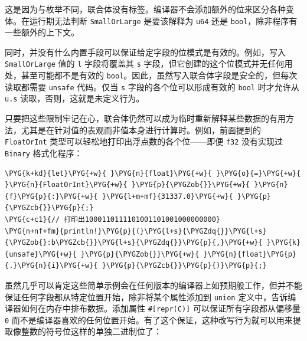 这是因为与枚举不同，联合体没有标签。编译器不会添加额外的位来区分各种变体。在运行期无法判断 \texttt{SmallOrLarge} 是要该解释为 \texttt{u64} 还是 \texttt{bool}，除非程序有一些额外的上下文。

同时，并没有什么内置手段可以保证给定字段的位模式是有效的。例如，写入 \texttt{SmallOrLarge} 值的 \texttt{l} 字段将覆盖其 \texttt{s} 字段，但它创建的这个位模式并无任何用处，甚至可能都不是有效的 \texttt{bool}。因此，虽然写入联合体字段是安全的，但每次读取都需要 \texttt{unsafe} 代码。仅当 \texttt{s} 字段的各个位可以形成有效的 \texttt{bool} 时才允许从 \texttt{u.s} 读取，否则，这就是未定义行为。

只要把这些限制牢记在心，联合体仍然可以成为临时重新解释某些数据的有用方法，尤其是在针对值的表观而非值本身进行计算时。例如，前面提到的 \texttt{FloatOrInt} 类型可以轻松地打印出浮点数的各个位——即便 \texttt{f32} 没有实现过 \texttt{Binary} 格式化程序：

\begin{Verbatim}[commandchars=\\\{\},breaklines=true,breakanywhere=true,fontsize=\codefont,xleftmargin=17bp]
\PYG{k+kd}{let}\PYG{+w}{ }\PYG{n}{float}\PYG{+w}{ }\PYG{o}{=}\PYG{+w}{ }\PYG{n}{FloatOrInt}\PYG{+w}{ }\PYG{p}{\PYGZob{}}\PYG{+w}{ }\PYG{n}{f}\PYG{p}{:}\PYG{+w}{ }\PYG{l+m+mf}{31337.0}\PYG{+w}{ }\PYG{p}{\PYGZcb{}}\PYG{p}{;}
\PYG{c+c1}{// 打印出1000110111101001101001000000000}
\PYG{n+nf+fm}{println!}\PYG{p}{(}\PYG{l+s}{\PYGZdq{}}\PYG{l+s}{\PYGZob{}:b\PYGZcb{}}\PYG{l+s}{\PYGZdq{}}\PYG{p}{,}\PYG{+w}{ }\PYG{k}{unsafe}\PYG{+w}{ }\PYG{p}{\PYGZob{}}\PYG{+w}{ }\PYG{n}{float}\PYG{p}{.}\PYG{n}{i}\PYG{+w}{ }\PYG{p}{\PYGZcb{}}\PYG{p}{)}\PYG{p}{;}
\end{Verbatim}

虽然几乎可以肯定这些简单示例会在任何版本的编译器上如预期般工作，但并不能保证任何字段都从特定位置开始，除非将某个属性添加到 \texttt{union} 定义中，告诉编译器如何在内存中排布数据。添加属性 \texttt{\#[repr(C)]} 可以保证所有字段都从偏移量 \texttt{0} 而不是编译器喜欢的任何位置开始。有了这个保证，这种改写行为就可以用来提取像整数的符号位这样的单独二进制位了：

